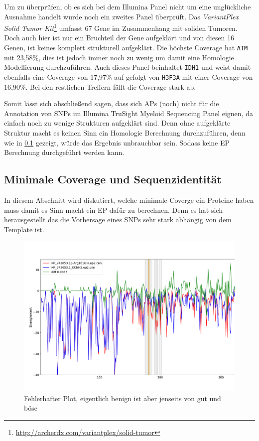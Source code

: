 Um zu überprüfen, ob es sich bei dem Illumina Panel nicht um eine unglückliche Ausnahme handelt wurde noch ein zweites Panel überprüft. Das \emph{VariantPlex Solid Tumor Kit}\footnote{\url{http://archerdx.com/variantplex/solid-tumor}} umfasst 67 Gene im Zusammenhang mit soliden Tumoren. Doch auch hier ist nur ein Bruchteil der Gene aufgeklärt und von diesen 16 Genen, ist keines komplett strukturell aufgeklärt. Die höchste Coverage hat \texttt{ATM} mit 23,58\%, dies ist jedoch immer noch zu wenig um damit eine Homologie Modellierung durchzuführen. Auch dieses Panel beinhaltet \texttt{IDH1} und weist damit ebenfalls eine Coverage von 17,97\% auf gefolgt von \texttt{H3F3A} mit einer Coverage von 16,90\%. Bei den restlichen Treffern fällt die Coverage stark ab.

Somit lässt sich abschließend sagen, dass sich \ac{APs} (noch) nicht für die Annotation von \ac{SNP}s im Illumina TruSight Myeloid Sequencing Panel eignen, da einfach noch zu wenige Strukturen aufgeklärt sind. Denn ohne aufgeklärte Struktur macht es keinen Sinn ein Homologie Berechnung durchzuführen, denn wie in \ref{sec:min_coverage} gezeigt, würde das Ergebnis unbrauchbar sein. Sodass keine \ac{EP} Berechnung durchgeführt werden kann. 


\subsection{Minimale Coverage und Sequenzidentität}
\label{sec:min_coverage}

In diesem Abschnitt wird diskutiert, welche minimale Coverge ein Proteine haben muss damit es Sinn macht ein \ac{EP} dafür zu berechnen. Denn es hat sich herausgestellt das die Vorhersage eines \ac{SNP}s sehr stark abhängig von dem Template ist.

\begin{figure}
    \centering
    \includegraphics[width=.99\textwidth]{images/comp_plot_KCNH2_Arg181Gln.png}
    \caption{Fehlerhafter Plot, eigentlich benign ist aber jenseits von gut und böse}
    \label{fig:fail_ep}
\end{figure}


